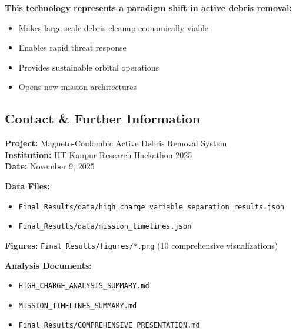 \documentclass[11pt,a4paper]{article}
\begin{document}
\textbf{This technology represents a paradigm shift in active debris removal:}
\begin{itemize}[leftmargin=*]
    \item Makes large-scale debris cleanup economically viable
    \item Enables rapid threat response
    \item Provides sustainable orbital operations
    \item Opens new mission architectures
\end{itemize}

\vspace{1cm}

\begin{center}
\end{center}

\vspace{1cm}

\subsection{Contact \& Further Information}

\textbf{Project:} Magneto-Coulombic Active Debris Removal System\\
\textbf{Institution:} IIT Kanpur Research Hackathon 2025\\
\textbf{Date:} November 9, 2025

\textbf{Data Files:}
\begin{itemize}[leftmargin=*]
    \item \texttt{Final\_Results/data/high\_charge\_variable\_separation\_results.json}
    \item \texttt{Final\_Results/data/mission\_timelines.json}
\end{itemize}

\textbf{Figures:} \texttt{Final\_Results/figures/*.png} (10 comprehensive visualizations)

\textbf{Analysis Documents:}
\begin{itemize}[leftmargin=*]
    \item \texttt{HIGH\_CHARGE\_ANALYSIS\_SUMMARY.md}
    \item \texttt{MISSION\_TIMELINES\_SUMMARY.md}
    \item \texttt{Final\_Results/COMPREHENSIVE\_PRESENTATION.md}
\end{itemize}
\end{document}
